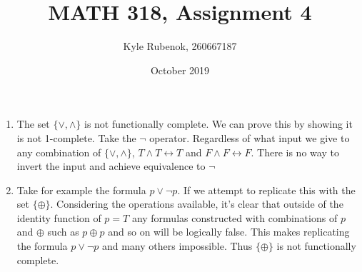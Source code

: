 \documentclass{article}
\title{MATH 318, Assignment 4}
\author{Kyle Rubenok, 260667187}
\date{October 2019}
\begin{document}
\maketitle

    \begin{enumerate}
        \item The set $\{\lor , \land \}$ is not functionally complete. We can prove this by showing it is not 1-complete. Take the $\neg$ operator. Regardless of what input we give to any combination of $\{\lor , \land \}$, ${T \land T \leftrightarrow T}$ and ${F \land F \leftrightarrow F}$. There is no way to invert the input and achieve equivalence to $\neg$
        \item Take for example the formula $p \lor \neg p$. If we attempt to replicate this with the set $\{\oplus\}$. Considering the operations available, it's clear that outside of the identity function of $p = T$ any formulas constructed with combinations of $p$ and $\oplus$ such as $p \oplus p$ and so on will be logically false. This makes replicating the formula $p \lor \neg p$ and many others impossible. Thus $\{\oplus\}$ is not functionally complete. 
    \end{enumerate}
\end{document}
